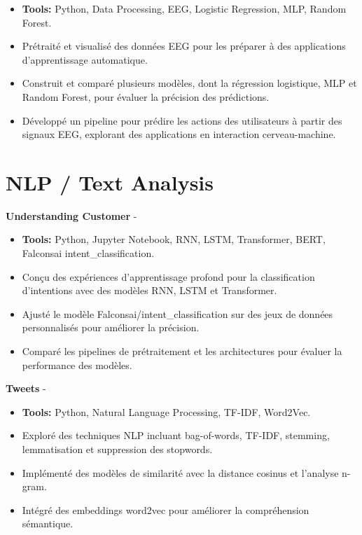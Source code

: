 \documentclass[a4paper,11pt]{article}%
\begin{document}
\begin{itemize}[leftmargin=2em,parsep=0pt,topsep=1em]%
\item[] \textbf{Tools:} Python, Data Processing, EEG, Logistic Regression, MLP, Random Forest.%
\item Pr\'etrait\'e et visualis\'e des donn\'ees EEG pour les pr\'eparer \`a des applications d'apprentissage automatique.%
\item Construit et compar\'e plusieurs mod\`eles, dont la r\'egression logistique, MLP et Random Forest, pour \'evaluer la pr\'ecision des pr\'edictions.%
\item D\'evelopp\'e un pipeline pour pr\'edire les actions des utilisateurs \`a partir des signaux EEG, explorant des applications en interaction cerveau-machine.%
\end{itemize}%
%
\section*{NLP / Text Analysis}%
%
\noindent \textbf{Understanding Customer} - \href{https://github.com/sboof911/Understanding-customer}{{}}%
\begin{itemize}[leftmargin=2em,parsep=0pt,topsep=1em]%
\item[] \textbf{Tools:} Python, Jupyter Notebook, RNN, LSTM, Transformer, BERT, Falconsai intent\_classification.%
\item Con\c{c}u des exp\'eriences d'apprentissage profond pour la classification d'intentions avec des mod\`eles RNN, LSTM et Transformer.%
\item Ajust\'e le mod\`ele Falconsai/intent\_classification sur des jeux de donn\'ees personnalis\'es pour am\'eliorer la pr\'ecision.%
\item Compar\'e les pipelines de pr\'etraitement et les architectures pour \'evaluer la performance des mod\`eles.%
\end{itemize}%
%
\noindent \textbf{Tweets} - \href{https://github.com/sboof911/tweets}{{}}%
\begin{itemize}[leftmargin=2em,parsep=0pt,topsep=1em]%
\item[] \textbf{Tools:} Python, Natural Language Processing, TF-IDF, Word2Vec.%
\item Explor\'e des techniques NLP incluant bag-of-words, TF-IDF, stemming, lemmatisation et suppression des stopwords.%
\item Impl\'ement\'e des mod\`eles de similarit\'e avec la distance cosinus et l'analyse n-gram.%
\item Int\'egr\'e des embeddings word2vec pour am\'eliorer la compr\'ehension s\'emantique.%
\end{itemize}%
%
\end{document}
